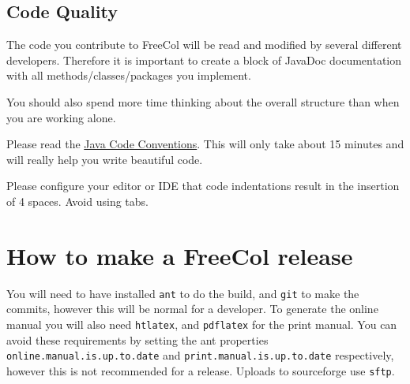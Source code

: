 \documentclass[12pt]{book}
\begin{document}
\hypertarget{Code Quality}{\section{Code Quality}}

The code you contribute to FreeCol will be read and modified by
several different developers. Therefore it is important to create
a block of JavaDoc documentation with all methods/classes/packages
you implement.

You should also spend more time thinking about the overall
structure than when you are working alone.

Please read the \href{http://www.oracle.com/technetwork/java/codeconvtoc-136057.html}{Java Code
  Conventions}. This will only take about 15 minutes and will really
help you write beautiful code.

Please configure your editor or IDE that code indentations
result in the insertion of 4 spaces. Avoid using tabs.


\hypertarget{How to build a FreeCol release}{\chapter{How to make a FreeCol release}}

You will need to have installed \texttt{ant} to do the
build, and \texttt{git} to make the commits, however this will be
normal for a developer. To generate the online manual you will also
need \texttt{htlatex}, and \texttt{pdflatex} for the print manual.
You can avoid these requirements by setting the ant properties
\texttt{online.manual.is.up.to.date} and
\texttt{print.manual.is.up.to.date} respectively, however this is not
recommended for a release. Uploads to sourceforge use \texttt{sftp}.
\end{document}
